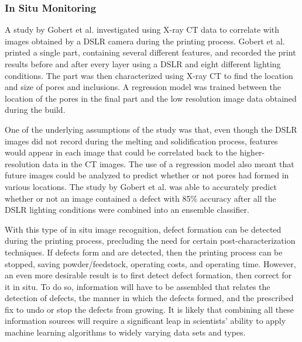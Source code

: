 \subsubsection{In Situ Monitoring}
A study by Gobert et al. investigated using X-ray CT data to correlate with images obtained by a DSLR camera during the printing process. Gobert et al. printed a single part, containing several different features, and recorded the print results before and after every layer using a DSLR and eight different lighting conditions. The part was then characterized using X-ray CT to find the location and size of pores and inclusions. A regression model was trained between the location of the pores in the final part and the low resolution image data obtained during the build. 

One of the underlying assumptions of the study was that, even though the DSLR images did not record during the melting and solidification process, features would appear in each image that could be correlated back to the higher-resolution data in the CT images. The use of a regression model also meant that future images could be analyzed to predict whether or not pores had formed in various locations. The study by Gobert et al. was able to accurately predict whether or not an image contained a defect with 85\% accuracy after all the DSLR lighting conditions were combined into an ensemble classifier. 

With this type of in situ image recognition, defect formation can be detected during the printing process, precluding the need for certain post-characterization techniques. If defects form and are detected, then the printing process can be stopped, saving powder/feedstock, operating costs, and operating time. However, an even more desirable result is to first detect defect formation, then correct for it in situ. To do so, information will have to be assembled that relates the detection of defects, the manner in which the defects formed, and the prescribed fix to undo or stop the defects from growing. It is likely that combining all these information sources will require a significant leap in scientists' ability to apply machine learning algorithms to widely varying data sets and types. 
